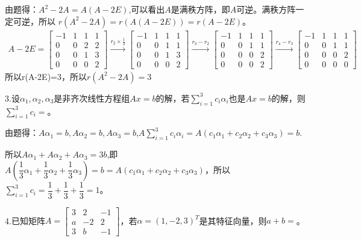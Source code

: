 \documentclass{article}
\begin{document}
\begin{jie}
由题得：$A^{2}-2A=A(A-2E)$,可以看出$A$是满秩方阵，即$A$可逆。\textcolor[rgb]{1.00,0.00,0.00}{满秩方阵一定可逆}，所以
$r(A^{2}-2A)=r(A(A-2E))=r(A-2E)$。
\begin{align*}
A-2E=
\begin{bmatrix}
-1 & 1 & 1 & 1\\
0 & 0 & 2 & 2\\
0 & 0 & 1 & 3\\
0 & 0 & 0 & 2
\end{bmatrix}
\xrightarrow{r_{2}\times\frac{1}{2}}
{
\begin{bmatrix}
-1 & 1 & 1 & 1\\
0 & 0 & 1 & 1\\
0 & 0 & 1 & 3\\
0 & 0 & 0 & 2
\end{bmatrix}
}\xrightarrow{r_{3}-r_{2}}
{
\begin{bmatrix}
-1 & 1 & 1 & 1\\
0 & 0 & 1 & 1\\
0 & 0 & 0 & 2\\
0 & 0 & 0 & 2
\end{bmatrix}
}\xrightarrow{r_{4}-r_{3}}
{
\begin{bmatrix}
-1 & 1 & 1 & 1\\
0 & 0 & 1 & 1\\
0 & 0 & 0 & 2\\
0 & 0 & 0 & 0
\end{bmatrix}
}
\end{align*}
所以r(A-2E)=3，所以$r(A^{2}-2A)=3$
\end{jie}

3.设$\alpha_{1},\alpha_{2},\alpha_{3}$是非齐次线性方程组$Ax=b$的解，若$\sum\limits_{i=1}^{3}c_{i}\alpha_{i}$也是$Ax=b$的解，则$\sum\limits_{i=1}^{3}c_{i}=$\underline{\hphantom{~~~~~~~~~~}}。

\begin{jie}
由题得：$A\alpha_{1}=b,A\alpha_{2}=b,A\alpha_{3}=b$,$A\sum\limits_{i=1}^{3}c_{i}\alpha_{i}=A(c_{1}\alpha_{1}+c_{2}\alpha_{2}+c_{3}\alpha_{3})=b$.

所以$A\alpha_{1}+A\alpha_{2}+A\alpha_{3}=3b$,即$A\left(\dfrac{1}{3}\alpha_{1}+\dfrac{1}{3}\alpha_{2}+\dfrac{1}{3}\alpha_{3}\right)=b=A(c_{1}\alpha_{1}+c_{2}\alpha_{2}+c_{3}\alpha_{3})$，所以$\sum\limits_ {i=1}^{3}c_{i}=\dfrac{1}{3}+\dfrac{1}{3}+\dfrac{1}{3}=1$。
\end{jie}

4.已知矩阵$
A=
\begin{bmatrix}
  3 & 2 & -1 \\
  a & -2 & 2\\
  3 & b & -1
\end{bmatrix}
$，若$\alpha=(1,-2,3)^{T}$是其特征向量，则$a+b=$\underline{\hphantom{~~~~~~~~~~}}。
\end{document}
